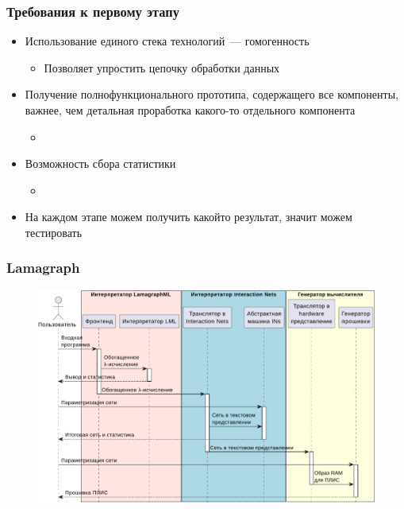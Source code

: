 \documentclass[aspectratio=169]{beamer}
\begin{document}
\begin{frame}
    \frametitle{Требования к первому этапу}

    \begin{itemize}
        \item Использование единого стека технологий~--- гомогенность
              \begin{itemize}
                  \item Позволяет упростить цепочку обработки данных
              \end{itemize}
        \item Получение полнофункционального прототипа, содержащего все компоненты, важнее, чем детальная проработка какого-то отдельного компонента
              \begin{itemize}
                  \item
              \end{itemize}
        \item Возможность сбора статистики
              \begin{itemize}
                  \item
              \end{itemize}
        \item На каждом этапе можем получить какойто результат, значит можем тестировать
    \end{itemize}

\end{frame}

\begin{frame}
    \frametitle{Lamagraph}

    \begin{figure}
        \includegraphics[width=0.75\linewidth]{pictures/using.pdf}
    \end{figure}

\end{frame}
\end{document}
